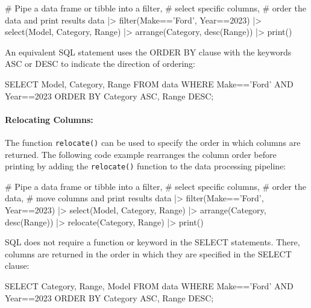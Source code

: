 \begin{samepage}
\begin{Rcode}
# Pipe a data frame or tibble into a filter,
# select specific columns,
# order the data and print results
data |> 
  filter(Make=='Ford', Year==2023) |> 
  select(Model, Category, Range) |>
  arrange(Category, desc(Range)) |>
  print()
\end{Rcode}
\end{samepage}

An equivalent SQL statement uses the ORDER BY clause with the keywords ASC or DESC to indicate the direction of ordering:

\begin{samepage}
\begin{sqlcode}
SELECT Model, Category, Range
   FROM data 
   WHERE Make=='Ford' AND Year==2023
   ORDER BY Category ASC, Range DESC;
\end{sqlcode}
\end{samepage}

\paragraph*{Relocating Columns:} The function \texttt{relocate()} can be used to specify the order in which columns are returned. The following code example rearranges the column order before printing by adding the \texttt{relocate()} function to the data processing pipeline:

\begin{samepage}
\begin{Rcode}
# Pipe a data frame or tibble into a filter,
# select specific columns,
# order the data,
# move columns and print results
data |> 
  filter(Make=='Ford', Year==2023) |> 
  select(Model, Category, Range) |>
  arrange(Category, desc(Range)) |>
  relocate(Category, Range) |>
  print()
\end{Rcode}
\end{samepage}

SQL does not require a function or keyword in the SELECT statements. There, columns are returned in the order in which they are specified in the SELECT clause:

\begin{samepage}
\begin{sqlcode}
SELECT Category, Range, Model
   FROM data 
   WHERE Make=='Ford' AND Year==2023
   ORDER BY Category ASC, Range DESC;
\end{sqlcode}
\end{samepage}

